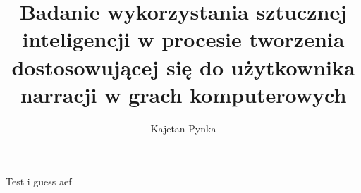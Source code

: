 \documentclass[magister,druk]{dyplom}
\author{Kajetan Pynka}
\title{Badanie wykorzystania sztucznej inteligencji w procesie tworzenia dostosowującej się do użytkownika narracji w grach komputerowych}
\begin{document}
\maketitle



Test i guess aef \cite{docker_compose_reference}

\tableofcontents







\listoffigures
\listoflistings
\listoftables

\appendixpage
\appendix




\end{document}
